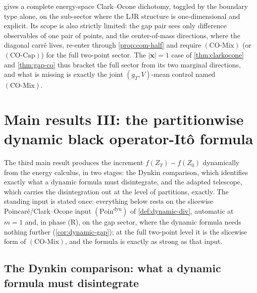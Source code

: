 \documentclass[reqno,final,11pt]{amsart}
\theoremstyle{plain}
\theoremstyle{definition}
\theoremstyle{remark}
\newcommand{\COcap}{(\mathrm{CO\text{-}Cap})}
\newcommand{\COmix}{(\mathrm{CO\text{-}Mix})}
\begin{document}
 gives a complete energy-space Clark--Ocone dichotomy,
toggled by the boundary type alone, on the sub-sector where the LJR structure
is one-dimensional and explicit. Its scope is also strictly limited: the gap
pair sees only difference observables of one pair of points, and the
center-of-mass directions, where the diagonal carr\'e lives, re-enter through
\cref{prop:com-half} and require $\COmix$ (or $\COcap$) for the full
two-point sector. The $|\mathbf x|=1$ case of \cref{thm:clarkocone} and
\cref{thm:gap-co} thus bracket the full sector from its two marginal
directions, and what is missing is exactly the joint $(g_T,V)$-mean control
named $\COmix$.

\section{Main results III: the partitionwise dynamic black operator-It\^o formula}\label{sec:dynamic}

The third main result produces the increment $f(Z_T)-f(Z_0)$ dynamically from
the energy calculus, in two stages: the Dynkin comparison, which identifies
exactly what a dynamic formula must disintegrate, and the adapted telescope,
which carries the disintegration out at the level of partitions, exactly. The
standing input is stated once: everything below rests on
the slicewise Poincar\'e/Clark--Ocone input
$(\mathrm{Poin}^{\mathrm{dyn}})$ of \cref{def:dynamic-div}, automatic at
$m=1$ and, in phase \textnormal{(R)}, on the gap sector, where the dynamic formula needs nothing further (\cref{cor:dynamic-gap}); at the full
two-point level it is the slicewise form of $\COmix$, and the formula is exactly as strong as that input.

\subsection{The Dynkin comparison: what a dynamic formula must disintegrate}
\end{document}
